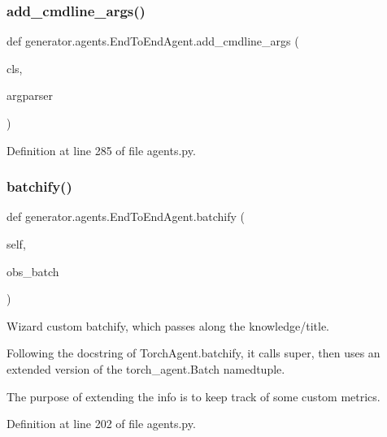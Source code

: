 \subsubsection{\texorpdfstring{add\+\_\+cmdline\+\_\+args()}{add\_cmdline\_args()}}
{\footnotesize\ttfamily def generator.\+agents.\+End\+To\+End\+Agent.\+add\+\_\+cmdline\+\_\+args (\begin{DoxyParamCaption}\item[{}]{cls,  }\item[{}]{argparser }\end{DoxyParamCaption})}



Definition at line 285 of file agents.\+py.

\mbox{\label{classgenerator_1_1agents_1_1EndToEndAgent_a91da888e366d029cb5efa373d4858e15}} 
\subsubsection{\texorpdfstring{batchify()}{batchify()}}
{\footnotesize\ttfamily def generator.\+agents.\+End\+To\+End\+Agent.\+batchify (\begin{DoxyParamCaption}\item[{}]{self,  }\item[{}]{obs\+\_\+batch }\end{DoxyParamCaption})}

\begin{DoxyVerb}Wizard custom batchify, which passes along the knowledge/title.

Following the docstring of TorchAgent.batchify, it calls super, then
uses an extended version of the torch_agent.Batch namedtuple.

The purpose of extending the info is to keep track of some custom
metrics.
\end{DoxyVerb}
 

Definition at line 202 of file agents.\+py.



